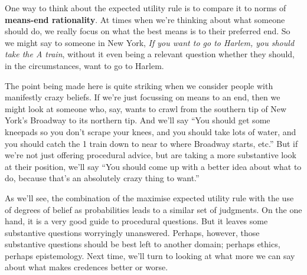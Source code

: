 One way to think about the expected utility rule is to compare it to norms of \textbf{means-end rationality}. At times when we're thinking about what someone should do, we really focus on what the best means is to their preferred end. So we might say to someone in New York, \textit{If you want to go to Harlem, you should take the A train}, without it even being a relevant question whether they should, in the circumstances, want to go to Harlem.

The point being made here is quite striking when we consider people with manifestly crazy beliefs. If we're just focussing on means to an end, then we might look at someone who, say, wants to crawl from the southern tip of New York's Broadway to its northern tip. And we'll say ``You should get some kneepads so you don't scrape your knees, and you should take lots of water, and you should catch the 1 train down to near to where Broadway starts, etc.'' But if we're not just offering procedural advice, but are taking a more substantive look at their position, we'll say ``You should come up with a better idea about what to do, because that's an absolutely crazy thing to want.''

As we'll see, the combination of the maximise expected utility rule with the use of degrees of belief as probabilities leads to a similar set of judgments. On the one hand, it is a very good guide to procedural questions. But it leaves some substantive questions worryingly unanswered. Perhaps, however, those substantive questions should be best left to another domain; perhaps ethics, perhaps epistemology. Next time, we'll turn to looking at what more we can say about what makes credences better or worse.